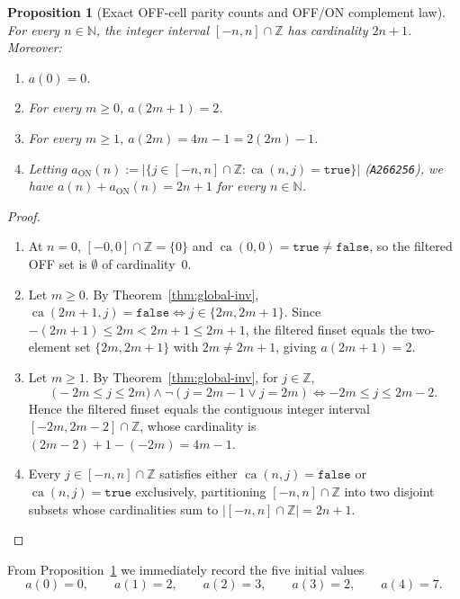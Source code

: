 \documentclass[11pt]{article}
\newtheorem{proposition}[theorem]{Proposition}
\theoremstyle{definition}
\newcommand{\N}{\mathbb{N}}
\newcommand{\Z}{\mathbb{Z}}
\newcommand{\seq}[1]{\texttt{#1}}
\newcommand{\ca}{\operatorname{ca}}
\begin{document}
\begin{proposition}[Exact OFF-cell parity counts and OFF/ON complement law]
\label{prop:counts}
For every $n \in \N$, the integer interval $[-n, n] \cap \Z$ has cardinality $2n + 1$. Moreover:
\begin{enumerate}
\item[\textup{(a)}] $a(0) = 0$.
\item[\textup{(b)}] For every $m \ge 0$, $a(2m + 1) = 2$.
\item[\textup{(c)}] For every $m \ge 1$, $a(2m) = 4m - 1 = 2(2m) - 1$.
\item[\textup{(d)}] Letting $a_{\mathrm{ON}}(n) := |\{j \in [-n, n] \cap \Z : \ca(n, j) = \mathtt{true}\}|$ (\seq{A266256}), we have $a(n) + a_{\mathrm{ON}}(n) = 2n + 1$ for every $n \in \N$.
\end{enumerate}
\end{proposition}

\begin{proof}
\begin{enumerate}
\item[\textup{(a)}] At $n = 0$, $[-0, 0] \cap \Z = \{0\}$ and $\ca(0, 0) = \mathtt{true} \ne \mathtt{false}$, so the filtered OFF set is $\emptyset$ of cardinality~$0$.
\item[\textup{(b)}] Let $m \ge 0$. By Theorem~\ref{thm:global-inv}, $\ca(2m + 1, j) = \mathtt{false} \iff j \in \{2m, 2m + 1\}$. Since $-(2m + 1) \le 2m < 2m + 1 \le 2m + 1$, the filtered finset equals the two-element set $\{2m, 2m + 1\}$ with $2m \ne 2m + 1$, giving $a(2m + 1) = 2$.
\item[\textup{(c)}] Let $m \ge 1$. By Theorem~\ref{thm:global-inv}, for $j \in \Z$,
\[
\bigl(-2m \le j \le 2m\bigr) \land \neg(j = 2m - 1 \lor j = 2m) \iff -2m \le j \le 2m - 2.
\]
Hence the filtered finset equals the contiguous integer interval $[-2m, 2m - 2] \cap \Z$, whose cardinality is $(2m - 2) + 1 - (-2m) = 4m - 1$.
\item[\textup{(d)}] Every $j \in [-n, n] \cap \Z$ satisfies either $\ca(n, j) = \mathtt{false}$ or $\ca(n, j) = \mathtt{true}$ exclusively, partitioning $[-n, n] \cap \Z$ into two disjoint subsets whose cardinalities sum to $|[-n, n] \cap \Z| = 2n + 1$. \qedhere
\end{enumerate}
\end{proof}

From Proposition~\ref{prop:counts} we immediately record the five initial values
\begin{equation}
\label{eq:init-vals}
a(0) = 0, \qquad a(1) = 2, \qquad a(2) = 3, \qquad a(3) = 2, \qquad a(4) = 7.
\end{equation}
\end{document}
